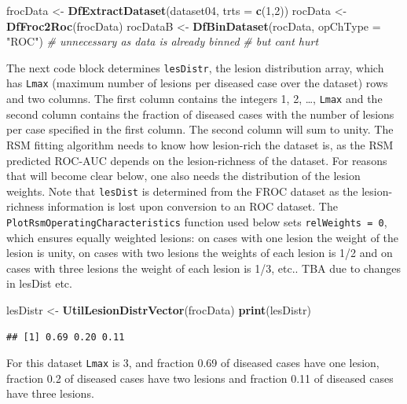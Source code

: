 \documentclass[
]{book}
\newenvironment{Shaded}{\begin{snugshade}}{\end{snugshade}}
\newcommand{\CommentTok}[1]{\textcolor[rgb]{0.56,0.35,0.01}{\textit{#1}}}
\newcommand{\DataTypeTok}[1]{\textcolor[rgb]{0.13,0.29,0.53}{#1}}
\newcommand{\DecValTok}[1]{\textcolor[rgb]{0.00,0.00,0.81}{#1}}
\newcommand{\KeywordTok}[1]{\textcolor[rgb]{0.13,0.29,0.53}{\textbf{#1}}}
\newcommand{\NormalTok}[1]{#1}
\newcommand{\StringTok}[1]{\textcolor[rgb]{0.31,0.60,0.02}{#1}}
\begin{document}
\begin{Shaded}
\begin{Highlighting}[]
\NormalTok{frocData <-}\StringTok{ }\KeywordTok{DfExtractDataset}\NormalTok{(dataset04, }\DataTypeTok{trts =} \KeywordTok{c}\NormalTok{(}\DecValTok{1}\NormalTok{,}\DecValTok{2}\NormalTok{))}
\NormalTok{rocData <-}\StringTok{ }\KeywordTok{DfFroc2Roc}\NormalTok{(frocData)}
\NormalTok{rocDataB <-}\StringTok{ }\KeywordTok{DfBinDataset}\NormalTok{(rocData, }\DataTypeTok{opChType =} \StringTok{"ROC"}\NormalTok{) }\CommentTok{# unnecessary as data is already binned}
\CommentTok{# but cant hurt}
\end{Highlighting}
\end{Shaded}

The next code block determines \texttt{lesDistr}, the lesion distribution array, which has \texttt{Lmax} (maximum number of lesions per diseased case over the dataset) rows and two columns. The first column contains the integers 1, 2, \ldots, \texttt{Lmax} and the second column contains the fraction of diseased cases with the number of lesions per case specified in the first column. The second column will sum to unity. The RSM fitting algorithm needs to know how lesion-rich the dataset is, as the RSM predicted ROC-AUC depends on the lesion-richness of the dataset. For reasons that will become clear below, one also needs the distribution of the lesion weights. Note that \texttt{lesDist} is determined from the FROC dataset as the lesion-richness information is lost upon conversion to an ROC dataset. The \texttt{PlotRsmOperatingCharacteristics} function used below sets \texttt{relWeights\ =\ 0}, which ensures equally weighted lesions: on cases with one lesion the weight of the lesion is unity, on cases with two lesions the weights of each lesion is 1/2 and on cases with three lesions the weight of each lesion is 1/3, etc.. TBA due to changes in lesDist etc.

\begin{Shaded}
\begin{Highlighting}[]
\NormalTok{lesDistr <-}\StringTok{ }\KeywordTok{UtilLesionDistrVector}\NormalTok{(frocData)}
\KeywordTok{print}\NormalTok{(lesDistr)}
\end{Highlighting}
\end{Shaded}

\begin{verbatim}
## [1] 0.69 0.20 0.11
\end{verbatim}

For this dataset \texttt{Lmax} is 3, and fraction 0.69 of diseased cases have one lesion, fraction 0.2 of diseased cases have two lesions and fraction 0.11 of diseased cases have three lesions.
\end{document}
